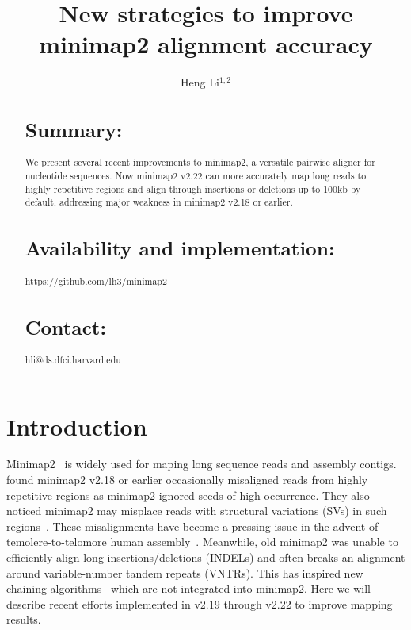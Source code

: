 \documentclass{bioinfo}
\begin{document}

\title[Improvements to minimap2]{New strategies to improve minimap2 alignment accuracy}
\author[Li]{Heng Li$^{1,2}$}
\address{$^1$Dana-Farber Cancer Institute, 450 Brookline Ave, Boston, MA 02215, USA,
$^2$Harvard Medical School, 10 Shattuck St, Boston, MA 02215, USA}

\maketitle

\begin{abstract}

\section{Summary:} We present several recent improvements to minimap2, a
versatile pairwise aligner for nucleotide sequences. Now minimap2 v2.22 can
more accurately map long reads to highly repetitive regions and align through
insertions or deletions up to 100kb by default, addressing major weakness in
minimap2 v2.18 or earlier.

\section{Availability and implementation:}
\href{https://github.com/lh3/minimap2}{https://github.com/lh3/minimap2}

\section{Contact:} hli@ds.dfci.harvard.edu
\end{abstract}

\section{Introduction}
Minimap2~\citep{Li:2018ab} is widely used for maping long sequence
reads and assembly contigs. \citet{Jain:2020aa} found minimap2 v2.18 or earlier occasionally
misaligned reads from highly repetitive regions as minimap2 ignored seeds of
high occurrence. They also noticed minimap2 may misplace reads with structural
variations (SVs) in such regions~\citep{Jain2020.11.01.363887}. These
misalignments have become a pressing issue in the advent of
temolere-to-telomore human assembly~\citep{Miga:2020aa}. Meanwhile, old minimap2
was unable to efficiently align long insertions/deletions (INDELs) and often
breaks an alignment around variable-number tandem repeats (VNTRs). This has
inspired new chaining algorithms~\citep{Li:2020aa,Ren:2021aa} which are not
integrated into minimap2. Here we will describe recent efforts implemented
in v2.19 through v2.22 to improve mapping results.
\end{document}
